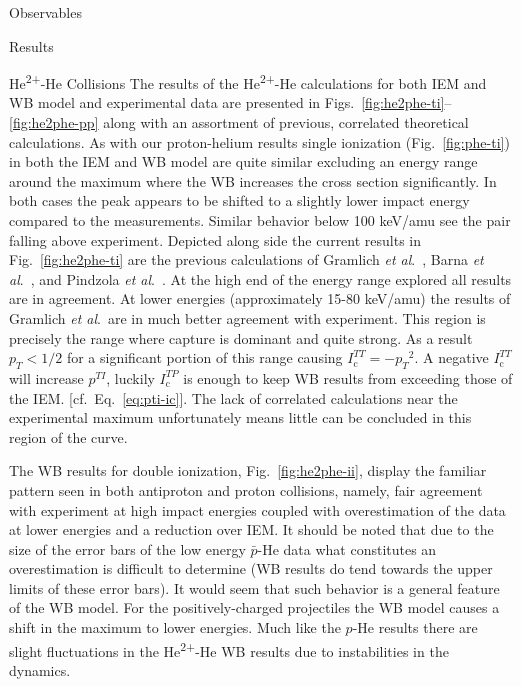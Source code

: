 \documentclass[letterpaper, 11 pt]{report}
\begin{document}
\begin{chapter}{Observables \label{chap:p-he2p-he}}
\begin{section}{Results \label{sec:phe2p-res}}
\begin{subsection}{\texorpdfstring{He\textsuperscript{2+}}{He2+}-He Collisions 
                         \label{sec:he2phe-res}}
         The results of the He\textsuperscript{2+}-He calculations for both IEM and WB model and
         experimental data are presented in Figs.~\ref{fig:he2phe-ti}--\ref{fig:he2phe-pp} along with
         an assortment of previous, correlated theoretical calculations. As with our proton-helium
         results single ionization (Fig.~\ref{fig:phe-ti}) in both the IEM and WB model are quite
         similar excluding an energy range around the maximum where the WB increases the cross section
         significantly. In both cases the peak appears to be shifted to a slightly lower impact energy
         compared to the measurements. Similar behavior below 100 keV/amu see the pair falling above
         experiment. Depicted along side the current results in Fig.~\ref{fig:he2phe-ti} are the
         previous calculations of Gramlich \textit{et al}.~\cite{GGS-89}, Barna
         \textit{et al}.~\cite{BTB-05}, and Pindzola \textit{et al}.~\cite{PRC-07}. At the high end of
         the energy range explored all results are in agreement. At lower energies (approximately
         15-80 keV/amu) the results of Gramlich \textit{et al}.\ are in much better agreement with
         experiment. This region is precisely the range where capture is dominant and quite strong. As
         a result $p_T < 1/2$ for a significant portion of this range causing $I^{TT}_\mathrm{c} =
         -{p_T}^2$. A negative $I^{TT}_\mathrm{c}$ will increase $p^{TI}$, luckily $I^{TP}_\mathrm{c}$
         is enough to keep WB results from exceeding those of the IEM. [cf.\ Eq.~\eqref{eq:pti-ic}]. The
         lack of correlated calculations near the experimental maximum unfortunately means little can be
         concluded in this region of the curve.

         The WB results for double ionization, Fig.~\ref{fig:he2phe-ii}, display the familiar pattern
         seen in both antiproton and proton collisions, namely, fair agreement with experiment at high
         impact energies coupled with overestimation of the data at lower energies and a reduction over
         IEM. It should be noted that due to the size of the error bars of the low energy $\bar{p}$-He
         data what constitutes an overestimation is difficult to determine (WB results do tend towards
         the upper limits of these error bars). It would seem that such behavior is a general feature of
         the WB model. For the positively-charged projectiles the WB model causes a shift in the maximum
         to lower energies. Much like the $p$-He results there are slight fluctuations in the
         He\textsuperscript{2+}-He WB results due to instabilities in the dynamics.


\end{subsection}
\end{section}
\end{chapter}
\end{document}
